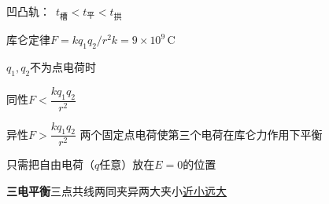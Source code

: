 凹凸轨：\ $t_{\text{槽}}<t_{\text{平}}<t_{\text{拱}}$

库仑定律\quad $F=kq_1q_2/r^2$\qquad $k=9\times10^9\,\mathrm{C}$ %

$q_1,q_2$不为点电荷时


同性\quad $F<\dfrac{kq_1q_2}{r^2}$

异性\quad $F>\dfrac{kq_1q_2}{r^2}$
两个固定点电荷使第三个电荷在库仑力作用下平衡

只需把自由电荷（$q$任意）放在$E=0$的位置

\textbf{三电平衡}\quad 三点共线\quad 两同夹异\quad 两大夹小\quad \underline{近小远大}
